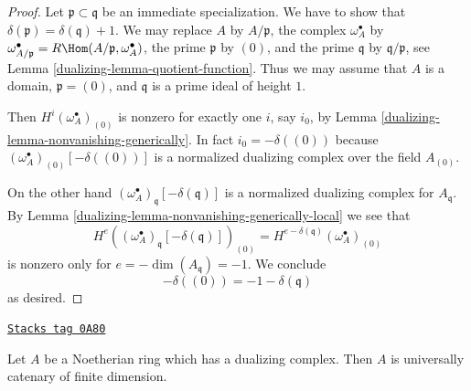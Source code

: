 \begin{proof}

Let $\mathfrak p \subset \mathfrak q$ be an immediate specialization.
We have to show that $\delta(\mathfrak p) = \delta(\mathfrak q) + 1$.
We may replace $A$ by $A/\mathfrak p$, the complex $\omega_A^\bullet$ by
$\omega_{A/\mathfrak p}^\bullet = R\Hom(A/\mathfrak p, \omega_A^\bullet)$,
the prime $\mathfrak p$ by $(0)$, and the prime $\mathfrak q$
by $\mathfrak q/\mathfrak p$,
see Lemma \ref{dualizing-lemma-quotient-function}. Thus we may assume that
$A$ is a domain, $\mathfrak p = (0)$, and $\mathfrak q$ is a prime
ideal of height $1$.

\medskip\noindent
Then $H^i(\omega_A^\bullet)_{(0)}$ is nonzero
for exactly one $i$, say $i_0$, by Lemma \ref{dualizing-lemma-nonvanishing-generically}.
In fact $i_0 = -\delta((0))$ because
$(\omega_A^\bullet)_{(0)}[-\delta((0))]$
is a normalized dualizing complex over the field $A_{(0)}$.

\medskip\noindent
On the other hand $(\omega_A^\bullet)_\mathfrak q[-\delta(\mathfrak q)]$
is a normalized dualizing complex for $A_\mathfrak q$. By
Lemma \ref{dualizing-lemma-nonvanishing-generically-local}
we see that
$$
H^e((\omega_A^\bullet)_\mathfrak q[-\delta(\mathfrak q)])_{(0)} =
H^{e - \delta(\mathfrak q)}(\omega_A^\bullet)_{(0)}
$$
is nonzero only for $e = -\dim(A_\mathfrak q) = -1$.
We conclude
$$
-\delta((0)) = -1 - \delta(\mathfrak q)
$$
as desired.
\end{proof}

\begin{lemma}
\label{dualizing-lemma-universally-catenary}
\href{https://stacks.math.columbia.edu/tag/0A80}{\texttt{Stacks tag 0A80}}

Let $A$ be a Noetherian ring which has a dualizing
complex. Then $A$ is universally catenary of finite dimension.
\end{lemma}

